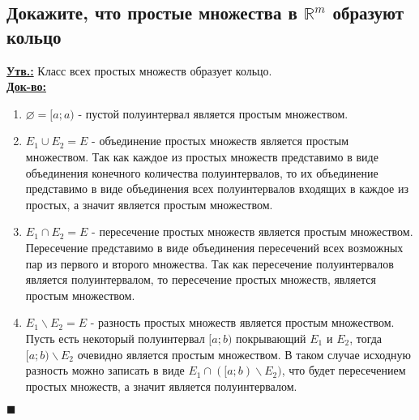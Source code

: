 
\subsection{Докажите, что простые множества в $\mathbb{R}^m$ образуют кольцо}

\textbf{\underline{Утв.:} } Класс всех простых множеств образует кольцо. \\
\textbf{\underline{Док-во:} } \\
\begin{enumerate}
    \item $\varnothing = [a; a)$ - пустой полуинтервал является простым множеством.
    \item $E_1 \cup E_2 = E$ - объединение простых множеств является простым множеством. Так как каждое из простых множеств представимо в виде объединения конечного количества полуинтервалов, то их объединение представимо в виде объединения всех полуинтервалов входящих в каждое из простых, а значит является простым множеством.
    \item $E_1 \cap E_2 = E$ - пересечение простых множеств является простым множеством. Пересечение представимо в виде объединения пересечений всех возможных пар из первого и второго множества. Так как пересечение полуинтервалов является полуинтервалом, то пересечение простых множеств, является простым множеством. 
    \item $E_1 \backslash E_2 = E$ - разность простых множеств является простым множеством. Пусть есть некоторый полуинтервал $[a; b)$ покрывающий $E_1$ и $E_2$, тогда $[a; b) \backslash E_2$ очевидно является простым множеством. В таком случае исходную разность можно записать в виде $E_1 \cap ([a; b) \backslash E_2)$, что будет пересечением простых множеств, а значит является полуинтервалом. 
\end{enumerate}
\begin{flushright}
$\blacksquare$
\end{flushright}



